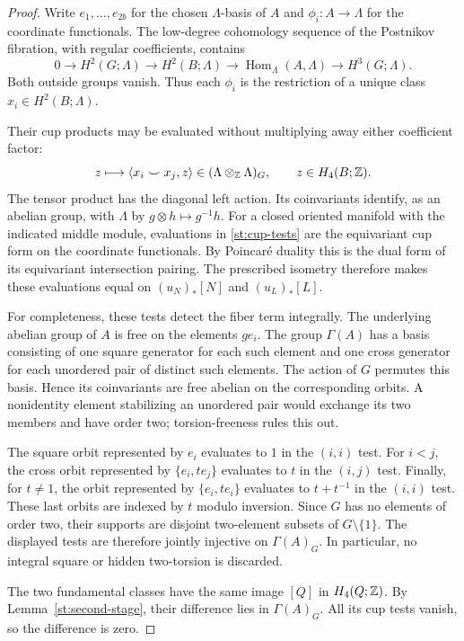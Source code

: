 \begin{proof}
Write $e_1,\ldots,e_{2b}$ for the chosen $\Lambda$-basis of $A$ and
$\phi_i\colon A\to\Lambda$ for the coordinate functionals.  The
low-degree cohomology sequence of the Postnikov fibration, with regular
coefficients, contains
\[
 0\longrightarrow H^2(G;\Lambda)
 \longrightarrow H^2(B;\Lambda)
 \longrightarrow\operatorname{Hom}_{\Lambda}(A,\Lambda)
 \longrightarrow H^3(G;\Lambda).
\]
Both outside groups vanish.  Thus each $\phi_i$ is the restriction of
a unique class $x_i\in H^2(B;\Lambda)$.

Their cup products may be evaluated without multiplying away either
coefficient factor:
\begin{equation}\label{st:cup-tests}
 z\longmapsto
 \langle x_i\smile x_j,z\rangle
 \in(\Lambda\otimes_{\mathbb Z}\Lambda)_G,
 \qquad z\in H_4(B;\mathbb Z).
\end{equation}
The tensor product has the diagonal left action.  Its coinvariants
identify, as an abelian group, with $\Lambda$ by
$g\otimes h\mapsto g^{-1}h$.  For a closed oriented manifold with
the indicated middle module, evaluations in \eqref{st:cup-tests} are
the equivariant cup form on the coordinate functionals.  By Poincar\'e
duality this is the dual form of its equivariant intersection pairing.
The prescribed isometry therefore makes these evaluations equal on
$(u_N)_*[N]$ and $(u_L)_*[L]$.

For completeness, these tests detect the fiber term integrally.  The
underlying abelian group of $A$ is free on the elements $g e_i$.
The group $\Gamma(A)$ has a basis consisting of one square generator
for each such element and one cross generator for each unordered pair
of distinct such elements.  The action of $G$ permutes this basis.
Hence its coinvariants are free abelian on the corresponding orbits.
A nonidentity element stabilizing an unordered pair would exchange its
two members and have order two; torsion-freeness rules this out.

The square orbit represented by $e_i$ evaluates to $1$ in the $(i,i)$
test.  For $i<j$, the cross orbit represented by
$\{e_i,t e_j\}$ evaluates to $t$ in the $(i,j)$ test.  Finally, for
$t\ne1$, the orbit represented by $\{e_i,t e_i\}$ evaluates to
$t+t^{-1}$ in the $(i,i)$ test.  These last orbits are indexed by $t$
modulo inversion.  Since $G$ has no elements of order two, their supports
are disjoint two-element subsets of $G\setminus\{1\}$.  The displayed
tests are therefore jointly injective on $\Gamma(A)_G$.  In particular,
no integral square or hidden two-torsion is discarded.

The two fundamental classes have the same image $[Q]$ in $H_4(Q;\mathbb Z)$.
By Lemma~\ref{st:second-stage}, their difference lies in
$\Gamma(A)_G$.  All its cup tests vanish, so the difference is zero.
\end{proof}

